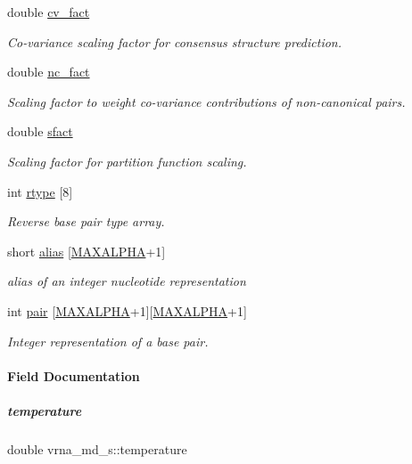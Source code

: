 \begin{DoxyCompactItemize}
double \mbox{\hyperlink{group__model__details_a62ebefb9d0643e5c4c8a2ec84a105ce6}{cv\+\_\+fact}}
\begin{DoxyCompactList}\small\item\em Co-\/variance scaling factor for consensus structure prediction. \end{DoxyCompactList}\item 
double \mbox{\hyperlink{group__model__details_abcf568e6124bfcb2f847ff4eb0dfded6}{nc\+\_\+fact}}
\begin{DoxyCompactList}\small\item\em Scaling factor to weight co-\/variance contributions of non-\/canonical pairs. \end{DoxyCompactList}\item 
double \mbox{\hyperlink{group__model__details_ab6f4cabaa9b4726b13592486d5bc21c7}{sfact}}
\begin{DoxyCompactList}\small\item\em Scaling factor for partition function scaling. \end{DoxyCompactList}\item 
int \mbox{\hyperlink{group__model__details_ad082d0fea31e002b90cdfe5e6382f8b0}{rtype}} \mbox{[}8\mbox{]}
\begin{DoxyCompactList}\small\item\em Reverse base pair type array. \end{DoxyCompactList}\item 
short \mbox{\hyperlink{group__model__details_a66136cf9abc8ff790ec0d33245d68fd5}{alias}} \mbox{[}\mbox{\hyperlink{pair__mat_8h_a05a5ffe718aa431d97419a12fb082379}{M\+A\+X\+A\+L\+P\+HA}}+1\mbox{]}
\begin{DoxyCompactList}\small\item\em alias of an integer nucleotide representation \end{DoxyCompactList}\item 
int \mbox{\hyperlink{group__model__details_ab4da594c638707e212f64aadb54a7454}{pair}} \mbox{[}\mbox{\hyperlink{pair__mat_8h_a05a5ffe718aa431d97419a12fb082379}{M\+A\+X\+A\+L\+P\+HA}}+1\mbox{]}\mbox{[}\mbox{\hyperlink{pair__mat_8h_a05a5ffe718aa431d97419a12fb082379}{M\+A\+X\+A\+L\+P\+HA}}+1\mbox{]}
\begin{DoxyCompactList}\small\item\em Integer representation of a base pair. \end{DoxyCompactList}\end{DoxyCompactItemize}


\paragraph{Field Documentation}
\mbox{\label{group__model__details_a5f7e5c2b65bada5188443470e576aa4b}} 
\subparagraph{\texorpdfstring{temperature}{temperature}}
{\footnotesize\ttfamily double vrna\+\_\+md\+\_\+s\+::temperature}



